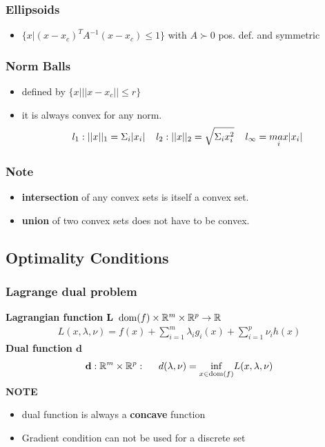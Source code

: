 \subsubsection{Ellipsoids}
\begin{itemize}
    \item $\{x|(x-x_c)^T A^{-1}(x-x_c) \leq 1\}$ with  $A\succ 0$ pos. def. and symmetric
\end{itemize}
\subsubsection{Norm Balls}
\begin{itemize}
    \item defined by $\{x|||x-x_c|| \leq r\}$
    \item it is always convex for any norm. 
    \[l_1: ||x||_1 = \Sigma_i|x_i| \hspace{4mm} l_2: ||x||_2 = \sqrt{\Sigma_ix_i^2} \hspace{4mm} l_\infty = \underset{i}{max}|x_i|\]
\end{itemize}
\subsubsection{Note}
\begin{itemize}
    \item \textbf{intersection} of any convex sets is itself a convex set.
    \item \textbf{union} of two convex sets does not have to be convex.
\end{itemize}

\subsection{Optimality Conditions}
\subsubsection{Lagrange dual problem}
\textbf{Lagrangian function}
    $\mathbf{L \hspace{2mm}}\mathrm{dom}(f) \times \mathbb{R}^m \times \mathbb{R}^p \rightarrow \mathbb{R}$
\begin{gather*}
    L(x,\lambda,\nu) = f(x) + \sum^m_{i=1} \lambda_i g_i(x)+\sum^p_{i=1}\nu_ih(x)
\end{gather*}
\textbf{Dual function $\mathbf{d}$}
\begin{gather*}
    \mathbf{d}: \mathbb{R}^m\times \mathbb{R}^p: \hspace{5mm} d(\lambda,\nu) = \underset{x\in\mathrm{dom}(f)}{\mathrm{inf}}L(x,\lambda,\nu)
\end{gather*}
\textbf{NOTE}
\begin{itemize}
    \item dual function is always a \textbf{concave} function
    \item Gradient condition can not be used for a discrete set
\end{itemize}

